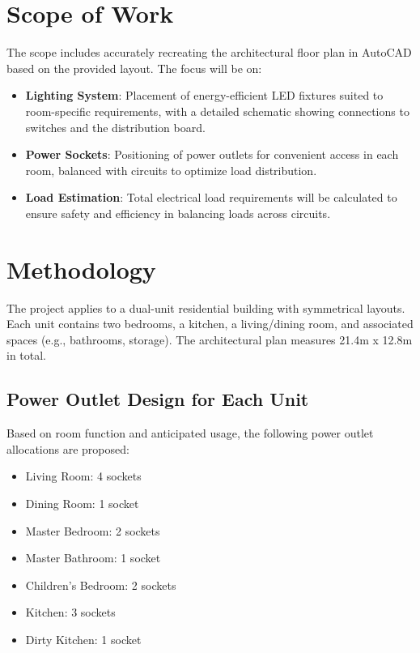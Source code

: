 \documentclass[a4paper,12pt]{article}
\begin{document}
\section{Scope of Work}
The scope includes accurately recreating the architectural floor plan in AutoCAD based on the provided layout. The focus will be on:
\begin{itemize}
    \item \textbf{Lighting System}: Placement of energy-efficient LED fixtures suited to room-specific requirements, with a detailed schematic showing connections to switches and the distribution board.
    \item \textbf{Power Sockets}: Positioning of power outlets for convenient access in each room, balanced with circuits to optimize load distribution.
    \item \textbf{Load Estimation}: Total electrical load requirements will be calculated to ensure safety and efficiency in balancing loads across circuits.
\end{itemize}

\section{Methodology}
The project applies to a dual-unit residential building with symmetrical layouts. Each unit contains two bedrooms, a kitchen, a living/dining room, and associated spaces (e.g., bathrooms, storage). The architectural plan measures 21.4m x 12.8m in total.

\subsection{Power Outlet Design for Each Unit}
Based on room function and anticipated usage, the following power outlet allocations are proposed:
\begin{itemize}
    \item Living Room: 4 sockets
    \item Dining Room: 1 socket
    \item Master Bedroom: 2 sockets
    \item Master Bathroom: 1 socket
    \item Children’s Bedroom: 2 sockets
    \item Kitchen: 3 sockets
    \item Dirty Kitchen: 1 socket
\end{itemize}
\end{document}
